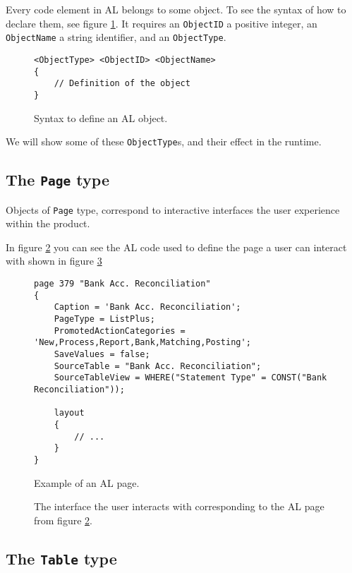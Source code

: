 Every code element in AL belongs to some object. To see the syntax of how to declare them, see figure \ref{f:appendix-alobject}.
It requires an \texttt{ObjectID} a positive integer, an \texttt{ObjectName} a string identifier, and an \texttt{ObjectType}.

\begin{figure}
    \begin{Verbatim}[fontsize=\tiny]
<ObjectType> <ObjectID> <ObjectName>
{
    // Definition of the object
}
    \end{Verbatim}
    \caption{Syntax to define an AL object.}
    \label{f:appendix-alobject}
\end{figure}

We will show some of these \texttt{ObjectType}s, and their effect in the runtime.

\subsection{The \texttt{Page} type}

Objects of \texttt{Page} type, correspond to interactive interfaces the user experience within the product.

In figure \ref{f:app-al-page-alcode} you can see the AL code used to define the page a user can interact with 
shown in figure \ref{f:app-al-page}

\begin{figure}
    \begin{Verbatim}[fontsize=\tiny]
page 379 "Bank Acc. Reconciliation"
{
    Caption = 'Bank Acc. Reconciliation';
    PageType = ListPlus;
    PromotedActionCategories = 'New,Process,Report,Bank,Matching,Posting';
    SaveValues = false;
    SourceTable = "Bank Acc. Reconciliation";
    SourceTableView = WHERE("Statement Type" = CONST("Bank Reconciliation"));

    layout
    {
        // ...
    }
}
    \end{Verbatim}
    \caption{Example of an AL page.}
    \label{f:app-al-page-alcode}
\end{figure}

\begin{figure}
    \caption{The interface the user interacts with corresponding to the AL page from figure \ref{f:app-al-page-alcode}.}
    \label{f:app-al-page}
\end{figure}

\subsection{The \texttt{Table} type}

